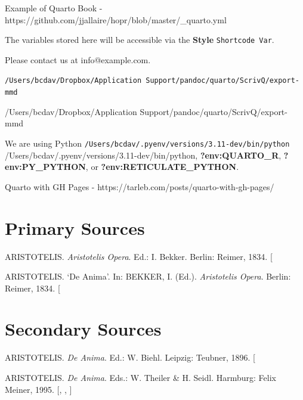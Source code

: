 \documentclass[
  12pt,
  a4paper,
  oneside,
  titlepage,
  toclink=all,
  toc=bibliography]{scrbook}
\newlength{\cslhangindent}
\newlength{\cslentryspacingunit} %
\newenvironment{CSLReferences}[2] %
 {%
  \setlength{\parindent}{0pt}
  \ifodd #1
  \let\oldpar\par
  \def\par{\hangindent=\cslhangindent\oldpar}
  \fi
  \setlength{\parskip}{#2\cslentryspacingunit}
 }%
 {}
\theoremstyle{definition}
\theoremstyle{definition}
\theoremstyle{plain}
\theoremstyle{definition}
\theoremstyle{plain}
\theoremstyle{plain}
\theoremstyle{plain}
\theoremstyle{plain}
\theoremstyle{remark}
\begin{document}
Example of Quarto Book -
https://github.com/jjallaire/hopr/blob/master/\_quarto.yml

The variables stored here will be accessible via the \textbf{Style}
\texttt{Shortcode\ Var}.

Please contact us at info@example.com.

\texttt{/Users/bcdav/Dropbox/Application\ Support/pandoc/quarto/ScrivQ/export-mmd}

/Users/bcdav/Dropbox/Application Support/pandoc/quarto/ScrivQ/export-mmd

We are using Python
\texttt{/Users/bcdav/.pyenv/versions/3.11-dev/bin/python}
/Users/bcdav/.pyenv/versions/3.11-dev/bin/python,
\textbf{?env:QUARTO\_R}, \textbf{?env:PY\_PYTHON}, or
\textbf{?env:RETICULATE\_PYTHON}.

Quarto with GH Pages - https://tarleb.com/posts/quarto-with-gh-pages/

\hypertarget{sec-scriv210}{%
\chapter{Primary Sources}\label{sec-scriv210}}

\hypertarget{refs_scriv210}{}
\begin{CSLReferences}{0}{1}
\leavevmode{}%
ARISTOTELIS. \emph{Aristotelis Opera}. Ed.: I. Bekker. Berlin: Reimer,
1834. {[}\Acrobatmenu{GoBack}{$\hookleftarrow$}{]}

\leavevmode{}%
ARISTOTELIS. {`De Anima'}. In: BEKKER, I. (Ed.). \emph{Aristotelis
Opera}. Berlin: Reimer, 1834.
{[}\Acrobatmenu{GoBack}{$\hookleftarrow$}{]}

\end{CSLReferences}

\hypertarget{sec-scriv211}{%
\chapter{Secondary Sources}\label{sec-scriv211}}

\hypertarget{refs_scriv211}{}
\begin{CSLReferences}{0}{1}
\leavevmode{}%
ARISTOTELIS. \emph{De Anima}. Ed.: W. Biehl. Leipzig: Teubner, 1896.
{[}\Acrobatmenu{GoBack}{$\hookleftarrow$}{]}

\leavevmode{}%
ARISTOTELIS. \emph{De Anima}. Eds.: W. Theiler \& H. Seidl. Harmburg:
Felix Meiner, 1995. {[},
\protect\hyperlink{cite_61}{\pageref{cite_61}},
\protect\hyperlink{cite_62}{\pageref{cite_62}}{]}

\end{CSLReferences}
\end{document}
